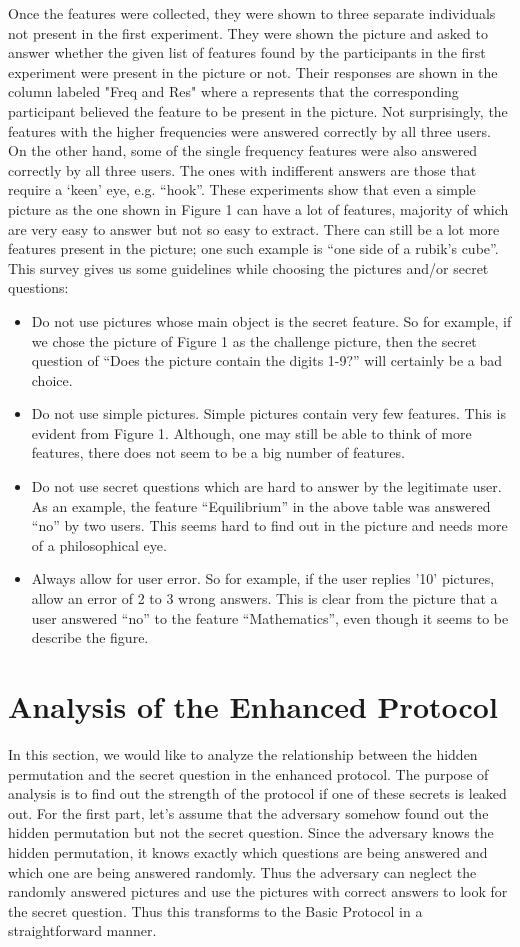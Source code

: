 \documentclass{llncs}
\newcommand{\tick}{\ding{52}}
\begin{document}
Once the features were collected, they were shown to three separate individuals not present in the first experiment. They were shown the picture and asked to answer whether the given list of features found by the participants in the first experiment were present in the picture or not. Their responses are shown in the column labeled "Freq and Res" where a \tick represents that the corresponding participant believed the feature to be present in the picture. Not surprisingly, the features with the higher frequencies were answered correctly by all three users. On the other hand, some of the single frequency features were also answered correctly by all three users. The ones with indifferent answers are those that require a `keen' eye, e.g. ``hook''.
These experiments show that even a simple picture as the one shown in Figure 1 can have a lot of features, majority of which are very easy to answer but not so easy to extract. There can still be a lot more features present in the picture; one such example is "`one side of a rubik's cube"'.
This survey gives us some guidelines while choosing the pictures and/or secret questions:
\begin{itemize}
	\item Do not use pictures whose main object is the secret feature. So for example, if we chose the picture of Figure 1 as the challenge picture, then the secret question of "`Does the picture contain the digits 1-9?"' will certainly be a bad choice.
	\item Do not use simple pictures. Simple pictures contain very few features. This is evident from Figure 1. Although, one may still be able to think of more features, there does not seem to be a big number of features.
	\item Do not use secret questions which are hard to answer by the legitimate user. As an example, the feature "`Equilibrium"' in the above table was answered "`no"' by two users. This seems hard to find out in the picture and needs more of a philosophical eye. 
	\item Always allow for user error. So for example, if the user replies '10' pictures, allow an error of 2 to 3 wrong answers. This is clear from the picture that a user answered "`no"' to the feature "`Mathematics"', even though it seems to be describe the figure. 
\end{itemize}
\section{Analysis of the Enhanced Protocol}
In this section, we would like to analyze the relationship between the hidden permutation  and the secret question  in the enhanced protocol. The purpose of analysis is to find out the strength of the protocol if one of these secrets is leaked out. For the first part, let's assume that the adversary somehow found out the hidden permutation  but not the secret question. Since the adversary knows the hidden permutation, it knows exactly which questions are being answered and which one are being answered randomly. Thus the adversary can neglect the randomly answered pictures and use the pictures with correct answers to look for the secret question. Thus this transforms to the Basic Protocol in a straightforward manner.
\end{document}
